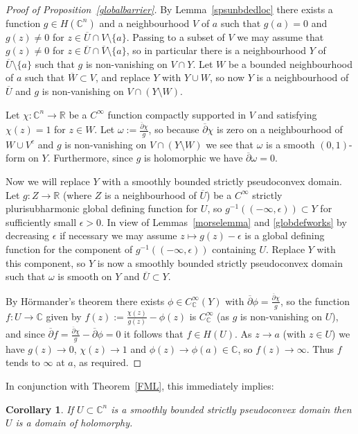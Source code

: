 \documentclass[11pt,a4paper, final, twoside]{article}
\newtheorem{corollary}[theorem]{Corollary}
\numberwithin{equation}{section}
\newcommand{\C}{\mathbb C}
\newcommand{\R}{\mathbb R}
\newcommand{\con}[1]{\overline{#1}}
\newcommand{\clos}[1]{\overline{#1}}
\newcommand{\hol}{H}
\newcommand{\cts}{C}
\newcommand{\ccts}{C_{\mathbb C}}
\begin{document}
\begin{proof}[Proof of Proposition~\ref{globalbarrier}]
By Lemma~\ref{spsunbdedloc} there exists a function $g\in\hol(\C^n)$ and a neighbourhood $V$ of $a$ such that $g(a)=0$ and $g(z)\neq 0$ for $z\in \clos{U}\cap V\setminus\{a\}$.
Passing to a subset of $V$ we may assume that $g(z)\neq 0$ for $z\in\clos{U}\cap \clos{V}\setminus\{a\}$, so in particular there is a neighbourhood $Y$
of $\clos{U}\setminus\{a\}$ such that $g$ is non-vanishing on $V\cap Y$.
Let $W$ be a bounded neighbourhood of $a$ such that $\clos{W}\subset V$, and replace $Y$ with $Y\cup W$, so now $Y$ is a neighbourhood of $\clos{U}$ and $g$
is non-vanishing on $V\cap (Y\setminus W)$.
 
Let $\chi\colon\C^n\to\R$ be a $\cts^\infty$ function compactly supported in $V$ and satisfying $\chi(z)=1$ for $z\in W$. 
Let $\omega:=\frac{\con\partial\chi}{g}$, so because $\con\partial\chi$ is zero on a neighbourhood of $W\cup V^c$ and $g$ is non-vanishing 
on $V\cap (Y\setminus W)$ we see that $\omega$ is a smooth $(0,1)$-form on $Y$. Furthermore, since $g$ is holomorphic we have $\con\partial\omega=0$.

Now
we will replace $Y$ with a smoothly bounded strictly pseudoconvex domain. 
Let $g\colon Z\to\R$ (where $Z$ is a neighbourhood of $\clos{U}$) be a $\cts^\infty$ strictly plurisubharmonic global defining
function for $U$, so $g^{-1}((-\infty,\epsilon))\subset Y$ for sufficiently small $\epsilon>0$. 
In view of Lemmas~\ref{morselemma} and \ref{globdefworks} by decreasing $\epsilon$ if necessary we may assume
$z\mapsto g(z)-\epsilon$ is a global defining function for the component of $g^{-1}((-\infty,\epsilon))$ containing $U$.
Replace $Y$ with this component,
so $Y$ is now a smoothly bounded strictly pseudoconvex domain such that $\omega$ is smooth on $Y$ and
$\clos{U}\subset Y$.

By H\"ormander's theorem there exists $\phi\in\ccts^\infty(Y)$ with $\con\partial\phi = \frac{\con\partial\chi}{g}$, so the function $f\colon U\to\C$ given by
$f(z):=\frac{\chi(z)}{g(z)}-\phi(z)$ is $\ccts^\infty$ (as $g$ is non-vanishing on $U$), and since $\con\partial f = \frac{\con\partial\chi}{g}-\con\partial\phi=0$ it follows that $f\in\hol(U)$.
As $z\to a$ (with $z\in U$) we have $g(z)\to 0$, $\chi(z)\to 1$ and $\phi(z)\to\phi(a)\in\C$, so $f(z)\to\infty$. Thus $f$ tends to $\infty$ at $a$, as required.
\end{proof}
In conjunction with Theorem~\ref{FML}, this immediately implies:
\begin{corollary}
\label{spsdh}
If $U\subset\C^n$ is a smoothly bounded strictly pseudoconvex domain then $U$ is a domain of holomorphy.
\end{corollary}
\end{document}
